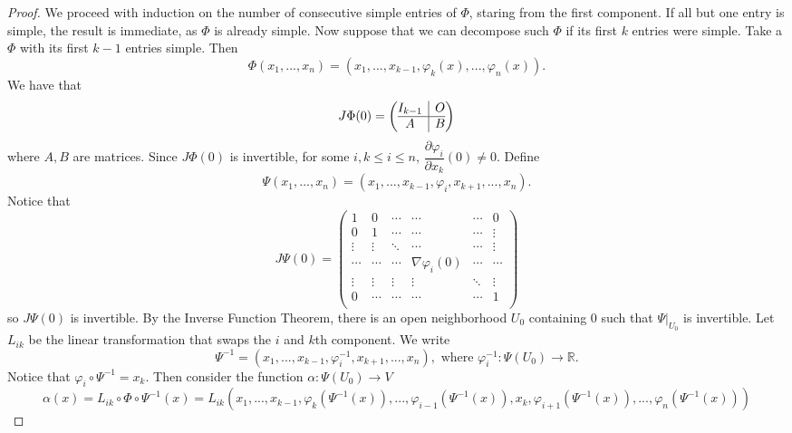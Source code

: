 \documentclass{article}
\theoremstyle{plain} %
\numberwithin{thm}{section} %
\theoremstyle{definition}
\begin{document}
\begin{proof}
        We proceed with induction on the number of consecutive simple entries of \(\Phi\), staring from the first component. If all but one entry is simple, the result is immediate, as \(\Phi\) is already simple. Now suppose that we can decompose such \(\Phi\) if its first \(k\) entries were simple. Take a \(\Phi\) with its first \(k-1\) entries simple. Then 
        \[
            \Phi (x_1, ..., x_n) = (x_1, ..., x_{k-1}, \varphi _k (x), ..., \varphi _n (x)).
        \]
        We have that
        \[
            J \Phi (0) = \left( \begin{array}{@{}c|c@{}}
                I_{k-1} & O \\
                \hline
                A & B
            \end{array} \right) 
        \]
        where \(A,B\) are matrices. Since \(J \Phi (0)\) is invertible, for some \(i, k \leq i \leq n\), \(\dfrac{\partial \varphi _i}{\partial x_k} (0) \neq 0\). Define
        \[
            \Psi (x_1, ..., x_n) = (x_1, ..., x_{k-1} , \varphi _i, x_{k+1} , ..., x_n).
        \]
        Notice that
        \[
            J \Psi (0) = \begin{pmatrix}
                1 & 0 & \cdots & \cdots & \cdots &  0 \\
                0 & 1 & \cdots & \cdots & \cdots &  \vdots \\
                \vdots & \vdots & \ddots & \cdots & \cdots &  \vdots \\
                \cdots & \cdots & \cdots & \nabla \varphi_i(0) & \cdots &  \cdots \\
                \vdots & \vdots & \vdots & \vdots & \ddots &  \vdots \\
                0 & \cdots & \cdots & \cdots & \cdots &  1 \\
            \end{pmatrix}
        \]
        so \(J \Psi(0)\) is invertible. By the Inverse Function Theorem, there is an open neighborhood \(U_0\) containing 0 such that \(\Psi | _{U_0}\) is invertible. Let \(L_{ik}\) be the linear transformation that swaps the \(i\) and \(k\)th component. We write
        \[
            \Psi^{-1} = (x_1, ..., x_{k-1} , \varphi _i^{-1} , x_{k+1} , ..., x_n), \text{ where } \varphi _i^{-1} : \Psi (U_0) \to \mathbb{R}.
        \]
        Notice that \(\varphi _i \circ \Psi^{-1} = x_k\). Then consider the function \(\alpha : \Psi (U_0) \to V\) 
        \[
            \alpha(x) = L_{ik} \circ \Phi \circ \Psi^{-1} (x) = L_{ik} (x_1, ..., x_{k-1} , \varphi _k (\Psi ^{-1}(x)), ..., \varphi _{i-1} (\Psi ^{-1}(x)), x_k, \varphi _{i+1} (\Psi ^{-1}(x)), ..., \varphi _n (\Psi ^{-1}(x)))
\]
\end{proof}
\end{document}
